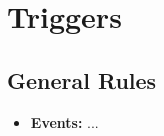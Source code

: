 
\section*{Triggers}

\subsection*{General Rules}
\begin{itemize}
    \item \textbf{Events:} ...
\end{itemize}
